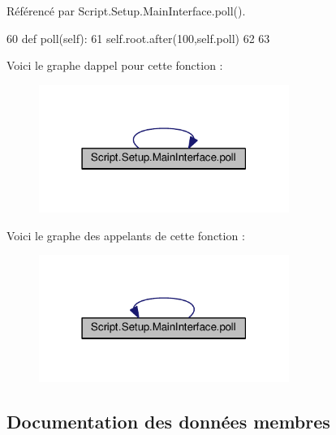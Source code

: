 Référencé par Script.\+Setup.\+Main\+Interface.\+poll().


\begin{DoxyCode}
60     \textcolor{keyword}{def }poll(self):
61         self.root.after(100,self.poll)
62 
63 
\end{DoxyCode}
Voici le graphe d\textquotesingle{}appel pour cette fonction \+:\nopagebreak
\begin{figure}[H]
\begin{center}
\leavevmode
\includegraphics[width=231pt]{classScript_1_1Setup_1_1MainInterface_a92190b04a1cf9aa5497439f2dd6dcd99_cgraph}
\end{center}
\end{figure}
Voici le graphe des appelants de cette fonction \+:\nopagebreak
\begin{figure}[H]
\begin{center}
\leavevmode
\includegraphics[width=231pt]{classScript_1_1Setup_1_1MainInterface_a92190b04a1cf9aa5497439f2dd6dcd99_icgraph}
\end{center}
\end{figure}


\subsection{Documentation des données membres}
\mbox{\label{classScript_1_1Setup_1_1MainInterface_a8ad532a968e6ccc0a5a1141d89b0bc79}} 
